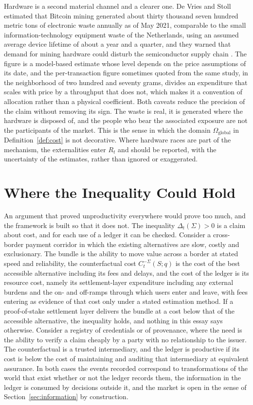 \documentclass[11pt]{article}
\theoremstyle{remark}
\begin{document}
Hardware is a second material channel and a clearer one. De Vries and Stoll estimated that Bitcoin mining generated about thirty thousand seven hundred metric tons of electronic waste annually as of May 2021, comparable to the small information-technology equipment waste of the Netherlands, using an assumed average device lifetime of about a year and a quarter, and they warned that demand for mining hardware could disturb the semiconductor supply chain \cite{devries2021}. The figure is a model-based estimate whose level depends on the price assumptions of its date, and the per-transaction figure sometimes quoted from the same study, in the neighborhood of two hundred and seventy grams, divides an expenditure that scales with price by a throughput that does not, which makes it a convention of allocation rather than a physical coefficient. Both caveats reduce the precision of the claim without removing its sign. The waste is real, it is generated where the hardware is disposed of, and the people who bear the associated exposure are not the participants of the market. This is the sense in which the domain $\Omega_{\mathrm{global}}$ in Definition~\ref{def:cost} is not decorative. Where hardware races are part of the mechanism, the externalities enter $R_t$ and should be reported, with the uncertainty of the estimates, rather than ignored or exaggerated.

\section{Where the Inequality Could Hold}\label{sec:where}

An argument that proved unproductivity everywhere would prove too much, and the framework is built so that it does not. The inequality $\Delta_t(\Sigma)>0$ is a claim about cost, and for each use of a ledger it can be checked. Consider a cross-border payment corridor in which the existing alternatives are slow, costly and exclusionary. The bundle is the ability to move value across a border at stated speed and reliability, the counterfactual cost $C_t^{-\Sigma}(S;q)$ is the cost of the best accessible alternative including its fees and delays, and the cost of the ledger is its resource cost, namely its settlement-layer expenditure including any external burdens and the on- and off-ramps through which users enter and leave, with fees entering as evidence of that cost only under a stated estimation method. If a proof-of-stake settlement layer delivers the bundle at a cost below that of the accessible alternative, the inequality holds, and nothing in this essay says otherwise. Consider a registry of credentials or of provenance, where the need is the ability to verify a claim cheaply by a party with no relationship to the issuer. The counterfactual is a trusted intermediary, and the ledger is productive if its cost is below the cost of maintaining and auditing that intermediary at equivalent assurance. In both cases the events recorded correspond to transformations of the world that exist whether or not the ledger records them, the information in the ledger is consumed by decisions outside it, and the market is open in the sense of Section~\ref{sec:information} by construction.
\end{document}
